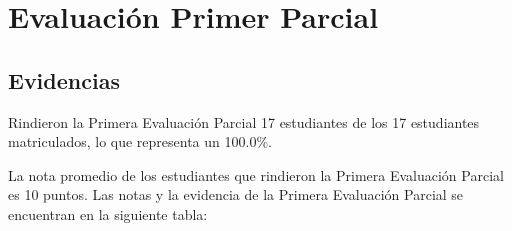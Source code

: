 \chapter{Evaluación Primer Parcial}
\newpage





\pagestyle{empty} %

\section{Evidencias}
Rindieron la Primera Evaluación Parcial 17 estudiantes de los 17 estudiantes matriculados, lo que representa un 100.0\%.

La nota promedio de los estudiantes que rindieron la Primera Evaluación Parcial es 10 puntos. Las notas y la evidencia de la Primera Evaluación Parcial se encuentran en la siguiente tabla:


